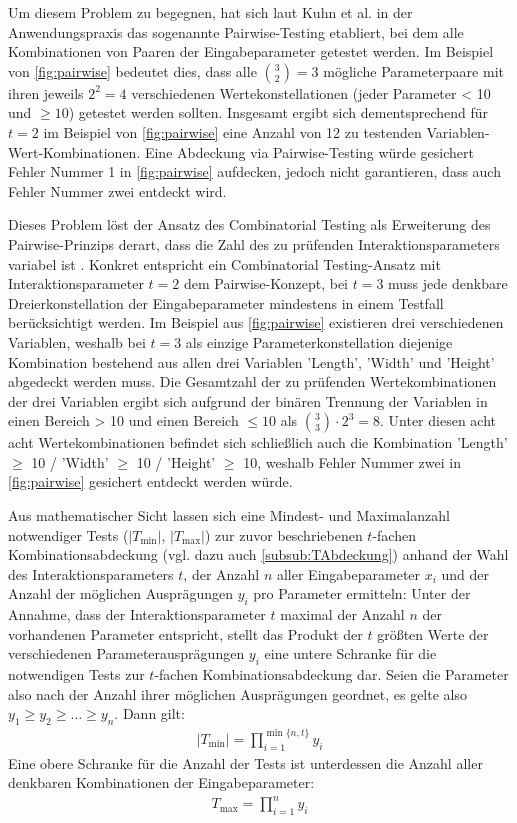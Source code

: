 Um diesem Problem zu begegnen, hat sich laut Kuhn et al. \cite{kuhn2010practical} in der Anwendungspraxis das sogenannte Pairwise-Testing etabliert, bei dem alle Kombinationen von Paaren der Eingabeparameter getestet werden. Im Beispiel von \autoref{fig:pairwise} bedeutet dies, dass alle $\binom{3}{2} = 3$ mögliche Parameterpaare mit ihren jeweils $2^2 = 4$ verschiedenen Wertekonstellationen (jeder Parameter < 10 und $\geq 10$) getestet werden sollten. Insgesamt ergibt sich dementsprechend für $t=2$ im Beispiel von \autoref{fig:pairwise} eine Anzahl von 12 zu testenden Variablen-Wert-Kombinationen. Eine Abdeckung via Pairwise-Testing würde gesichert Fehler Nummer 1 in \autoref{fig:pairwise} aufdecken, jedoch nicht garantieren, dass auch Fehler Nummer zwei entdeckt wird.

Dieses Problem löst der Ansatz des Combinatorial Testing als Erweiterung des Pairwise-Prinzips derart, dass die Zahl des zu prüfenden Interaktionsparameters variabel ist \cite{kuhn2010practical}. Konkret entspricht ein Combinatorial Testing-Ansatz mit Interaktionsparameter $t=2$ dem Pairwise-Konzept, bei $t=3$ muss jede denkbare Dreierkonstellation der Eingabeparameter mindestens in einem Testfall berücksichtigt werden. Im Beispiel aus \autoref{fig:pairwise} existieren drei verschiedenen Variablen, weshalb bei $t=3$ als einzige Parameterkonstellation diejenige Kombination bestehend aus allen drei Variablen 'Length', 'Width' und 'Height' abgedeckt werden muss. Die Gesamtzahl der zu prüfenden Wertekombinationen der drei Variablen ergibt sich aufgrund der binären Trennung der Variablen in einen Bereich > 10 und einen Bereich $\leq 10$ als $\binom{3}{3} \cdot 2^3 = 8$. Unter diesen acht acht Wertekombinationen befindet sich schließlich auch die Kombination 'Length' $\geq$ 10 / 'Width' $\geq$ 10 / 'Height' $\geq$ 10, weshalb Fehler Nummer zwei in \autoref{fig:pairwise} gesichert entdeckt werden würde.

Aus mathematischer Sicht lassen sich eine Mindest- und Maximalanzahl notwendiger Tests ($|T_{\min}|$, $|T_{\max}|$) zur zuvor beschriebenen $t$-fachen Kombinationsabdeckung (vgl. dazu auch \autoref{subsub:TAbdeckung}) anhand der Wahl des Interaktionsparameters $t$, der Anzahl $n$ aller Eingabeparameter $x_i$ und der Anzahl der möglichen Ausprägungen $y_i$ pro Parameter ermitteln: Unter der Annahme, dass der Interaktionsparameter $t$ maximal der Anzahl $n$ der vorhandenen Parameter entspricht, stellt das Produkt der $t$ größten Werte der verschiedenen Parameterausprägungen $y_i$ eine untere Schranke für die notwendigen Tests zur $t$-fachen Kombinationsabdeckung dar. Seien die Parameter also nach der Anzahl ihrer möglichen Ausprägungen geordnet, es gelte also $y_1 \geq y_2 \geq \dots \geq y_n$. Dann gilt:
\begin{gather}
|T_{\min}| = \prod_{i = 1}^{\min\{n,t\}} y_i
\end{gather}
Eine obere Schranke für die Anzahl der Tests ist unterdessen die Anzahl aller denkbaren Kombinationen der Eingabeparameter:
\begin{gather}
T_{\max} = \prod_{i=1}^{n} y_i
\end{gather}

